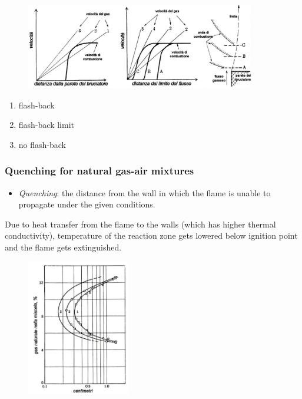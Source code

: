 \documentclass[12pt]{article}
\begin{document}
\begin{figure}[h!]
\centering
\includegraphics[width=0.9\textwidth]{figures/flash.png}
\end{figure}

\begin{enumerate}
    \item flash-back
    \item flash-back limit
    \item no flash-back
\end{enumerate}

\subsubsection{Quenching for natural gas-air mixtures}

\begin{itemize}
    \item \textit{Quenching}: the distance from the wall in which the flame is unable to propagate under the given conditions.
\end{itemize}
Due to heat transfer from the flame to the walls (which has higher thermal conductivity), temperature of the reaction zone gets lowered below ignition point and the flame gets extinguished.

\begin{figure}[h!]
\centering
\includegraphics[width=0.4\textwidth]{figures/quenching.png}
\end{figure}
\end{document}

